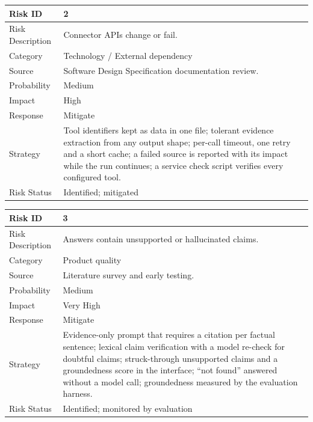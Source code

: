 \documentclass[oneside,a4paper,12pt]{report}
\begin{document}
\begin{table}[!htbp]
\begin{center}
\def\arraystretch{1.5}
\begin{tabularx}{\textwidth}{| l | X |}
\hline
Risk ID	& 2 \\ \hline
Risk Description	& Connector APIs change or fail. \\ \hline
Category	& Technology / External dependency \\ \hline
Source	& Software Design Specification documentation review. \\ \hline
Probability	& Medium \\ \hline
Impact	& High \\ \hline
Response	& Mitigate \\ \hline
Strategy	& Tool identifiers kept as data in one file; tolerant evidence extraction from any output shape; per-call timeout, one retry and a short cache; a failed source is reported with its impact while the run continues; a service check script verifies every configured tool. \\ \hline
Risk Status	& Identified; mitigated \\ \hline
\end{tabularx}
\end{center}
\label{tab:risk2}
\end{table}

\begin{table}[!htbp]
\begin{center}
\def\arraystretch{1.5}
\begin{tabularx}{\textwidth}{| l | X |}
\hline
Risk ID	& 3 \\ \hline
Risk Description	& Answers contain unsupported or hallucinated claims. \\ \hline
Category	& Product quality \\ \hline
Source	& Literature survey and early testing. \\ \hline
Probability	& Medium \\ \hline
Impact	& Very High \\ \hline
Response	& Mitigate \\ \hline
Strategy	& Evidence-only prompt that requires a citation per factual sentence; lexical claim verification with a model re-check for doubtful claims; struck-through unsupported claims and a groundedness score in the interface; ``not found'' answered without a model call; groundedness measured by the evaluation harness. \\ \hline
Risk Status	& Identified; monitored by evaluation \\ \hline
\end{tabularx}
\end{center}
\label{tab:risk3}
\end{table}
\end{document}
